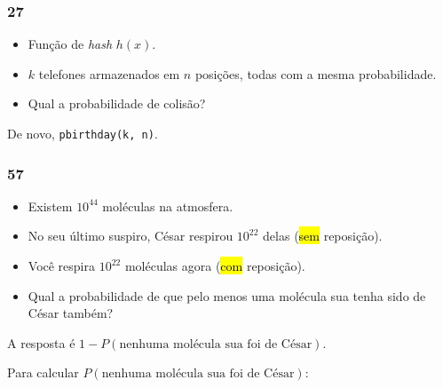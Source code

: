\documentclass[
  11pt]{report}
\begin{document}
\hypertarget{section-6}{%
\subsubsection*{27}\label{section-6}}

\begin{rmdbox}

\begin{itemize}
\item
  Função de \emph{hash} $h(x)$.
\item
  $k$ telefones armazenados em $n$ posições, todas com a mesma probabilidade.
\item
  Qual a probabilidade de colisão?
\end{itemize}

\end{rmdbox}

De novo, \texttt{pbirthday(k,\ n)}.

\hypertarget{section-7}{%
\subsubsection*{57}\label{section-7}}

\begin{rmdbox}

\begin{itemize}
\item
  Existem $10^{44}$ moléculas na atmosfera.
\item
  No seu último suspiro, César respirou $10^{22}$ delas ({\hl{sem}} reposição).
\item
  Você respira $10^{22}$ moléculas agora ({\hl{com}} reposição).
\item
  Qual a probabilidade de que pelo menos uma molécula sua tenha sido de César também?
\end{itemize}

\end{rmdbox}

A resposta é $1 - P(\text{nenhuma molécula sua foi de César})$.

Para calcular $P(\text{nenhuma molécula sua foi de César})$:
\end{document}
